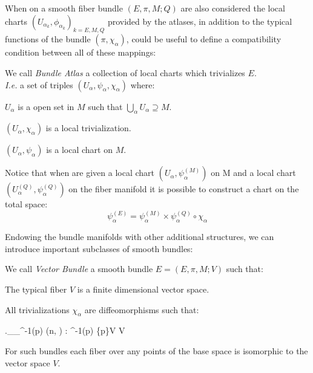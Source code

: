 \documentclass[Main]{subfiles}
\begin{document}
			When on a smooth fiber bundle $(E,\pi,M;Q)$ are also considered the local charts $(U_{\alpha_k}, \phi_{\alpha_k})_{k = E,M,Q}$ provided by the atlases, in addition to the typical functions of the bundle $(\pi, \chi_{\alpha})$,  could be useful to define a compatibility condition between all of these mappings:
			\begin{definition}
				We call \emph{Bundle Atlas} a collection of local charts which trivializes $E$.\\
				\textit{I.e.} a set of triples  $(U_\alpha, \psi_\alpha, \chi_\alpha)$ where:
				\begin{compactitemize}
					\item $U_\alpha$ is a open set in $M$ such that $\bigcup_{\alpha} U_{\alpha} \supseteq M$.
					\item $(U_\alpha,\chi_\alpha)$  is a local trivialization.
					\item $(U_\alpha,\psi_\alpha)$ is a local chart on $M$.
				\end{compactitemize}
			\end{definition}

			Notice that when are given a local chart $(U_\alpha, \psi_\alpha^{(M)} )$ on M and a local chart $(U_\alpha^{(Q)}, \psi_\alpha^{(Q)})$ on the fiber manifold it is possible to construct a chart on the total space:
				\begin{displaymath}
							\psi^{(E)}_\alpha = \psi_\alpha^{(M)} \times  \psi_\alpha^{(Q)} \circ \chi_\alpha
				\end{displaymath}
			\vspace{3mm}

			Endowing the bundle manifolds with other additional structures, we can introduce important subclasses of smooth bundles:
			\begin{definition}
				We call \emph{Vector Bundle} a smooth bundle $E=(E,\pi,M;V)$ such that:
				\begin{compactitemize}
					\item The typical fiber $V$ is a finite dimensional vector space.
					\item All trivializations $\chi_{\alpha} $ are diffeomorphisms such that:
						\begin{compactdisplaymath}
							\left.\chi_{\alpha}\right\vert_{\pi^{-1}(p)} \in {}(n, )
							\quad : \; \pi^{-1}(p) \rightarrow \{p\}\times V \simeq V
						\end{compactdisplaymath}
				\end{compactitemize}
			\end{definition}
			For such bundles each fiber over any points of the base space is isomorphic to the vector space $V$.
\end{document}
